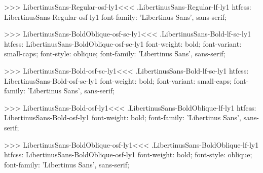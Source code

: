 >>>
\<LibertinusSans-Regular-osf-ly1\><<<
.LibertinusSans-Regular-lf-ly1
htfcss:  LibertinusSans-Regular-osf-ly1  font-family: 'Libertinus Sans', sans-serif;

>>>
\<LibertinusSans-BoldOblique-osf-sc-ly1\><<<
.LibertinusSans-Bold-lf-sc-ly1
htfcss:  LibertinusSans-BoldOblique-osf-sc-ly1  font-weight: bold; font-variant: small-caps; font-style: oblique; font-family: 'Libertinus Sans', sans-serif;

>>>
\<LibertinusSans-Bold-osf-sc-ly1\><<<
.LibertinusSans-Bold-lf-sc-ly1
htfcss:  LibertinusSans-Bold-osf-sc-ly1  font-weight: bold; font-variant: small-caps; font-family: 'Libertinus Sans', sans-serif;

>>>
\<LibertinusSans-Bold-osf-ly1\><<<
.LibertinusSans-BoldOblique-lf-ly1
htfcss:  LibertinusSans-Bold-osf-ly1  font-weight: bold; font-family: 'Libertinus Sans', sans-serif;

>>>
\<LibertinusSans-BoldOblique-osf-ly1\><<<
.LibertinusSans-BoldOblique-lf-ly1
htfcss:  LibertinusSans-BoldOblique-osf-ly1  font-weight: bold; font-style: oblique; font-family: 'Libertinus Sans', sans-serif;

